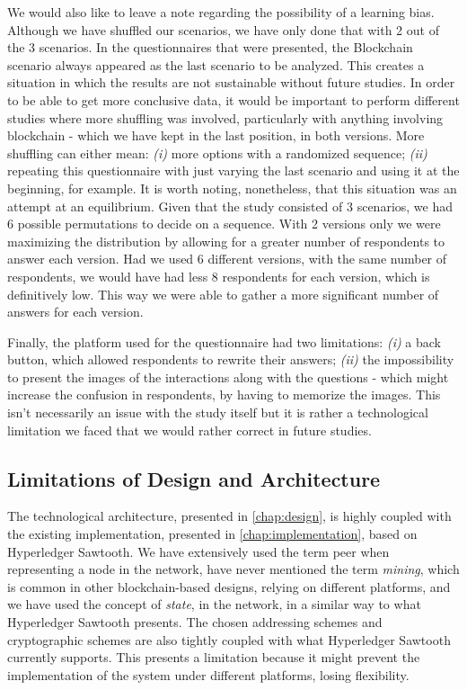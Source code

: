 We would also like to leave a note regarding the possibility of a learning bias. Although we have shuffled our scenarios, we have only done that with 2 out of the 3 scenarios. In the questionnaires that were presented, the Blockchain scenario always appeared as the last scenario to be analyzed. This creates a situation in which the results are not sustainable without future studies. In order to be able to get more conclusive data, it would be important to perform different studies where more shuffling was involved, particularly with anything involving blockchain - which we have kept in the last position, in both versions. More shuffling can either mean: \textit{(i)} more options with a randomized sequence; \textit{(ii)} repeating this questionnaire with just varying the last scenario and using it at the beginning, for example. It is worth noting, nonetheless, that this situation was an attempt at an equilibrium. Given that the study consisted of 3 scenarios, we had 6 possible permutations to decide on a sequence. With 2 versions only we were maximizing the distribution by allowing for a greater number of respondents to answer each version. Had we used 6 different versions, with the same number of respondents, we would have had less 8 respondents for each version, which is definitively low. This way we were able to gather a more significant number of answers for each version.

Finally, the platform used for the questionnaire had two limitations: \textit{(i)} a back button, which allowed respondents to rewrite their answers; \textit{(ii)} the impossibility to present the images of the interactions along with the questions - which might increase the confusion in respondents, by having to memorize the images. This isn't necessarily an issue with the study itself but it is rather a technological limitation we faced that we would rather correct in future studies.

\subsection{Limitations of Design and Architecture}

The technological architecture, presented in \ref{chap:design}, is highly coupled with the existing implementation, presented in \ref{chap:implementation}, based on Hyperledger Sawtooth. We have extensively used the term peer when representing a node in the network, have never mentioned the term \emph{mining}, which is common in other blockchain-based designs, relying on different platforms, and we have used the concept of \emph{state}, in the network, in a similar way to what Hyperledger Sawtooth presents. The chosen addressing schemes and cryptographic schemes are also tightly coupled with what Hyperledger Sawtooth currently supports. This presents a limitation because it might prevent the implementation of the system under different platforms, losing flexibility.

